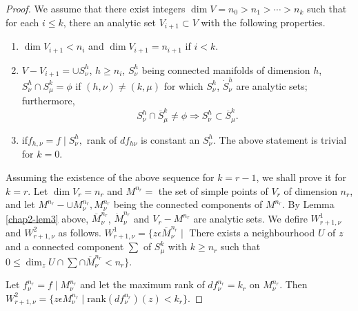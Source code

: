 \begin{proof} %
  We assume that there exist integers $\dim V =n_0 > n_1 >\cdots >
  n_k$ such that for each $i \leq k$, there an analytic set $V_{i+1}
  \subset V$ with the following properties. 
\begin{enumerate}[(1)]
\item $\dim V_{i+1}< n_i$ and $\dim V_{i+1} = n_{i+1}$ if $i < k$.

\item $V - V_{i+1} = \cup S^h_\nu$, $h \ge n_i$, $S^h_\nu$ being
  connected manifolds of dimension $h$, $S^h_\nu \cap S^k_\mu = \phi$ if
  $(h,\nu) \neq (k,\mu)$ for which $S^h_\nu$, $\dot{S}^h_\nu$ are analytic sets;
  furthermore,  
  $$ 
  S^h_\nu \cap \overline{S}^k_\mu \neq \phi \Rightarrow S^h_\nu
  \subset \overline{S}^k_\mu. 
  $$

\item if\pageoriginale $f_{h,\nu}=f\mid S^h_\nu,$ rank of $df_{h\nu}$
  is constant an 
  $S^h_\nu$. The above statement is trivial for $k = 0$.  
\end{enumerate}

Assuming the existence of the above sequence for $k = r-1$, we shall
prove it for $k=r$. Let $\dim V_r = n_r$ and $M^{n_r} =$ the set of simple
points of $V_r$ of dimension $n_r$, and let $M^{n_r} - \cup
M^{n_r}_{\nu},M^{n_r}_\nu$ being the connected components of
$M^{n_r}$. By Lemma \ref{chap2-lem3} above,
$\overline{M}^{n_r}_\nu$, $\dot{M}^{n_r}_\nu$ and $V_r-M^{n_r}$ are
analytic sets. We defire $W^1_{r+1,\nu}$ and $W^2_{r+1,\nu}$ as
follows. $W^1_{r+1,\nu} = \bigg\{z\epsilon \overline{M}^{n_r}_\nu
\mid$  There exists a neighbourhood $U$ of $z$ and a connected
component $\sum$ of $S^k_\mu$ with $k \geq n_r$ such that $0 \leq
\dim_z U \cap \sum \cap \overline{M}^{n_r}_\nu < n_r \bigg\}$. 

Let $f^{n_r}_\nu = f \mid M^{n_r}_\nu$ and let the maximum rank of
$df^{n_r}_\nu=k_r$ on $M^{n_r}_\nu$. Then $W^2_{r+1,\nu} = \bigg\{z
\epsilon M^{n_r}_\nu \mid \text{rank} (df^{n_r}_\nu)(z)< k_r\bigg\}$. 


\end{proof}
